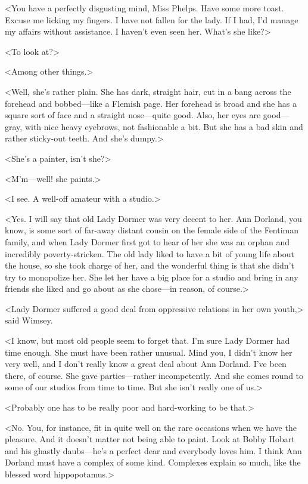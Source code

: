 <You have a perfectly disgusting mind, Miss Phelps. Have some more toast. Excuse me licking my fingers. I have not fallen for the lady. If I had, I'd manage my affairs without assistance. I haven't even seen her. What's she like?>

<To look at?>

<Among other things.>

<Well, she's rather plain. She has dark, straight hair, cut in a bang across the forehead and bobbed—like a Flemish page. Her forehead is broad and she has a square sort of face and a straight nose—quite good. Also, her eyes are good—gray, with nice heavy eyebrows, not fashionable a bit. But she has a bad skin and rather sticky-out teeth. And she's dumpy.>

<She's a painter, isn't she?>

<M'm—well! she paints.>

<I see. A well-off amateur with a studio.>

<Yes. I will say that old Lady Dormer was very decent to her. Ann Dorland, you know, is some sort of far-away distant cousin on the female side of the Fentiman family, and when Lady Dormer first got to hear of her she was an orphan and incredibly poverty-stricken. The old lady liked to have a bit of young life about the house, so she took charge of her, and the wonderful thing is that she didn't try to monopolize her. She let her have a big place for a studio and bring in any friends she liked and go about as she chose—in reason, of course.>

<Lady Dormer suffered a good deal from oppressive relations in her own youth,> said Wimsey.

<I know, but most old people seem to forget that. I'm sure Lady Dormer had time enough. She must have been rather unusual. Mind you, I didn't know her very well, and I don't really know a great deal about Ann Dorland. I've been there, of course. She gave parties—rather incompetently. And she comes round to some of our studios from time to time. But she isn't really one of us.>

<Probably one has to be really poor and hard-working to be that.>

<No. You, for instance, fit in quite well on the rare occasions when we have the pleasure. And it doesn't matter not being able to paint. Look at Bobby Hobart and his ghastly daubs—he's a perfect dear and everybody loves him. I think Ann Dorland must have a complex of some kind. Complexes explain so much, like the blessed word hippopotamus.>

